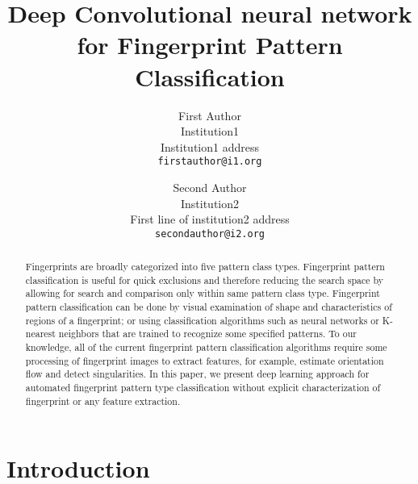 \documentclass[10pt,twocolumn,letterpaper]{article}
\begin{document}
\title{Deep Convolutional neural network for Fingerprint Pattern Classification}

\author{First Author\\
Institution1\\
Institution1 address\\
{\tt\small firstauthor@i1.org}
\and
Second Author\\
Institution2\\
First line of institution2 address\\
{\tt\small secondauthor@i2.org}
}

\maketitle
\thispagestyle{empty}

\begin{abstract}
   Fingerprints are broadly categorized into five pattern class types.
   Fingerprint pattern classification is useful for quick exclusions and 
   therefore reducing the search space by allowing for search and 
   comparison only within same pattern class type.
   Fingerprint pattern classification can be done by visual examination of
   shape and characteristics of regions of a fingerprint; or using classification 
   algorithms such as neural networks or K-nearest neighbors that are trained 
   to recognize some specified patterns.  To our knowledge, all of the current 
   fingerprint pattern classification algorithms require some processing of 
   fingerprint images to extract features, for example, estimate orientation flow 
   and detect singularities.   In this paper, we present deep learning approach 
   for automated fingerprint pattern type classification without explicit characterization  
   of fingerprint or any feature extraction.
\end{abstract}

\section{Introduction}



\end{document}
